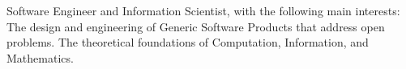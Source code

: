     \begin{cvparagraph}

        Software Engineer and Information Scientist, with the following main interests:\newline
        { The design and engineering of Generic Software Products that address open problems.}\newline
        { The theoretical foundations of Computation, Information, and Mathematics.}
    \end{cvparagraph}